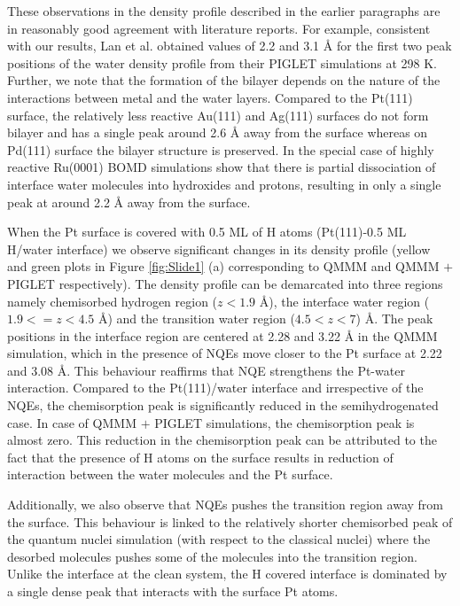 These observations in the density profile described in the earlier
paragraphs are in reasonably good agreement with literature
reports\cite{lan2020ionization,gross2022ab}. For example, consistent with our results, Lan et al. obtained
values of 2.2 and 3.1 \AA{} for the first two peak positions
of the water density profile from their PIGLET simulations
at 298 K.\cite{lan2020ionization} Further, we note that the formation of the bilayer depends on the nature of the interactions between
metal and the water layers. Compared to the Pt(111) surface, the relatively less reactive Au(111) and Ag(111) surfaces\cite{le2018structure,li2021establishment} do not form bilayer and has a single peak around 2.6 \AA{} away from the surface whereas on Pd(111) surface\cite{le2018structure} the bilayer structure is preserved. In the special case of highly reactive Ru(0001) BOMD
simulations show that there is partial dissociation of interface water molecules into hydroxides and protons, resulting in only a single peak at around 2.2 \AA{} away from the surface.\cite{feibelman2002partial,maier2014unveiling}    

When the Pt surface is covered with 0.5 ML of H atoms
(Pt(111)-0.5 ML H/water interface) we observe significant changes
in its density profile (yellow and green plots in Figure \ref{fig:Slide1} (a) corresponding to QMMM and QMMM $+$ PIGLET respectively). The density profile can be demarcated into three regions namely chemisorbed hydrogen region ($z< 1.9$ \AA{}), the interface water region ($ 1.9 <= z < 4.5$ \AA)
and the transition water region ($4.5 < z < 7$) \AA{}.
The peak positions in the interface region are centered at 2.28 and 3.22 \AA{} in the QMMM simulation, which in the presence of NQEs move closer to the Pt surface at 2.22 and 3.08 \AA{}. This behaviour reaffirms that NQE strengthens the Pt-water interaction. Compared to the Pt(111)/water interface and irrespective of the NQEs, the chemisorption peak is significantly reduced in the semihydrogenated case. In case
of QMMM $+$ PIGLET simulations, the chemisorption peak is almost zero. This reduction in the chemisorption peak
can be attributed to the fact that the presence of H atoms
on the surface results in reduction of interaction between the
water molecules and the Pt surface.

Additionally, we also observe that NQEs pushes the transition region away from the surface. This behaviour is linked to the relatively shorter chemisorbed peak of the quantum nuclei simulation (with respect to the classical nuclei) where the desorbed molecules pushes some of the molecules into the transition region. Unlike the interface at the clean system, the H covered interface is dominated by a single dense peak that interacts with the surface Pt atoms. 

